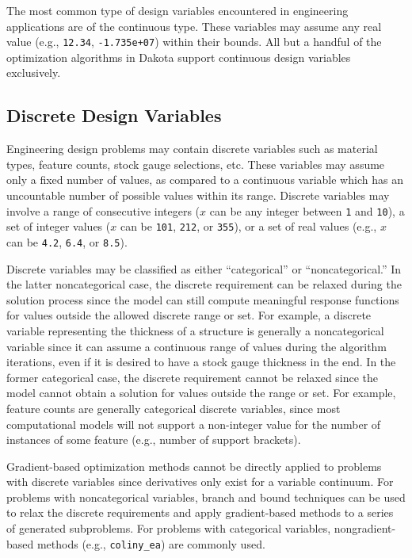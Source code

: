 The most common type of design variables encountered in engineering
applications are of the continuous type. These variables may assume
any real value (e.g., \texttt{12.34}, \texttt{-1.735e+07}) within
their bounds. All but a handful of the optimization algorithms in
Dakota support continuous design variables exclusively.

\subsection{Discrete Design Variables}\label{variables:design:ddv}

Engineering design problems may contain discrete variables such as
material types, feature counts, stock gauge selections, etc. These
variables may assume only a fixed number of values, as compared to
a continuous variable which has an uncountable number of possible 
values within its range.  Discrete variables may involve a range 
of consecutive integers ($x$ can be any integer between 
\texttt{1} and \texttt{10}), a set of integer values ($x$ can 
be \texttt{101}, \texttt{212}, or \texttt{355}), or a set of real 
values (e.g., $x$ can be \texttt{4.2}, \texttt{6.4}, or \texttt{8.5}).

Discrete variables may be classified as either ``categorical'' or
``noncategorical.''  In the latter noncategorical case, the discrete
requirement can be relaxed during the solution process since the model
can still compute meaningful response functions for values outside the
allowed discrete range or set. For example, a discrete variable
representing the thickness of a structure is generally a
noncategorical variable since it can assume a continuous range of
values during the algorithm iterations, even if it is desired to have
a stock gauge thickness in the end. In the former categorical case,
the discrete requirement cannot be relaxed since the model cannot
obtain a solution for values outside the range or set. For example,
feature counts are generally categorical discrete variables, since
most computational models will not support a non-integer value for the
number of instances of some feature (e.g., number of support brackets).

Gradient-based optimization methods cannot be directly applied to
problems with discrete variables since derivatives only exist for a
variable continuum. For problems with noncategorical variables, branch
and bound techniques can be used to relax the discrete requirements
and apply gradient-based methods to a series of generated
subproblems. For problems with categorical variables,
nongradient-based methods (e.g., \texttt{coliny\_ea}) are commonly
used. 

